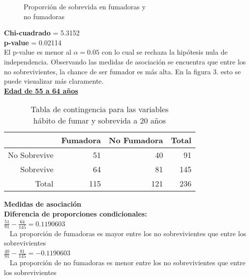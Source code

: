 \documentclass[12pt,letterpaper,fleqn]{article}
\begin{document}
\begin{enumerate}[label=\textbf{\arabic*.}]
\begin{enumerate}[label=\textbf{\alph*.}]
                \begin{figure}[!htb]
                    \centering
                    
                    \caption{Proporción de sobrevida en fumadoras y \\no fumadoras}
                    \label{fig:figure1}
                \end{figure}
                \FloatBarrier
                \textbf{Chi-cuadrado} = 5.3152 \\
                \textbf{p-value} = 0.02114 \\
                El p-value es menor al $ \alpha = 0.05 $ con lo cual se rechaza la hipótesis nula de independencia. Observando las medidas de asociación se encuentra que entre los no sobrevivientes, la chance de ser fumador es más alta. En la figura 3. esto se puede visualizar más claramente.\\

                \underline{\textbf{Edad de 55 a 64 años}}
                \begin{table}[ht]
                    \centering
                    \caption{Tabla de contingencia para las variables \\ hábito de fumar y sobrevida a 20 años}
                    \begin{tabular}{rrrr}
                      \hline
                     & Fumadora & No Fumadora \vline& Total \\
                      \hline
                    No Sobrevive & 51 & 40 \vline& 91 \\
                      Sobrevive & 64 & 81 \vline& 145 \\
                      \hline
                      Total & 115 & 121 \vline& 236 \\
                       \hline
                    \end{tabular}
                \end{table}

                \textbf{Medidas de asociación} \\
                \textbf{Diferencia de proporciones condicionales:} \\
                $ \frac{51}{91}-\frac{64}{145} = 0.1190603 $ \\ 
                La proporción de fumadoras es mayor entre los no sobrevivientes que entre los sobrevivientes \\
                $ \frac{40}{91}-\frac{81}{145} = -0.1190603 $ \\ 
                La proporción de no fumadoras es menor entre los no sobrevivientes que entre los sobrevivientes\\


\end{enumerate}
\end{enumerate}
\end{document}
